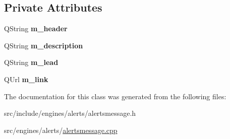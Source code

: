 \subsection*{Private Attributes}
\begin{DoxyCompactItemize}
\item 
\mbox{\label{classAlertsEngine_1_1Message_ad6a3061911f65418a0d3b47f4e296cfd}} 
Q\+String {\bfseries m\+\_\+header}
\item 
\mbox{\label{classAlertsEngine_1_1Message_ac5e8f3c8cd7c891ff82113cbc29573b3}} 
Q\+String {\bfseries m\+\_\+description}
\item 
\mbox{\label{classAlertsEngine_1_1Message_a6bff02029f8c7ecbf7f6d0d921a39f05}} 
Q\+String {\bfseries m\+\_\+lead}
\item 
\mbox{\label{classAlertsEngine_1_1Message_ab45be7942acc34c94047983a43ab8340}} 
Q\+Url {\bfseries m\+\_\+link}
\end{DoxyCompactItemize}


The documentation for this class was generated from the following files\+:\begin{DoxyCompactItemize}
\item 
src/include/engines/alerts/alertsmessage.\+h\item 
src/engines/alerts/\mbox{\hyperlink{alertsmessage_8cpp}{alertsmessage.\+cpp}}\end{DoxyCompactItemize}
